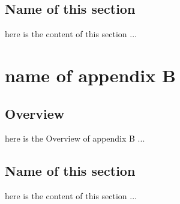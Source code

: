 \documentclass[a4paper,twoside,phd]{BYUPhys}
\begin{document}
\section{Name of this section}
here is the content of this section ...
\chapter{name of appendix B}
\section{Overview}
here is the Overview of appendix B ...
\section{Name of this section}
here is the content of this section ...

%

%

%
\end{document}
